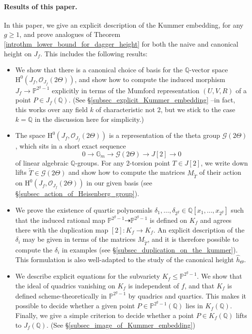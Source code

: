 \documentclass{article} %
\numberwithin{equation}{section}
\newcommand{\G}{\mathbb{G}}
\renewcommand{\P}{\mathbb{P}}
\newcommand{\HH}{\mathrm{H}}
\newcommand{\cO}{\mathcal{O}}
\newcommand{\Q}{\mathbb{Q}}
\begin{document}
\paragraph{Results of this paper.} In this paper, we give an explicit description of the Kummer embedding, for any $g \geq 1$, and prove analogues of Theorem \ref{introthm_lower_bound_for_dagger_height} for both the naive and canonical height on $J_f$. This includes the following results:
\begin{itemize}
    \item We  show that there is a canonical choice of basis for the $\Q$-vector space $\HH^0(J_f, \cO_{J_f}(2 \Theta))$, and show how to compute the induced morphism $J_f \to \P^{2^g-1}$ explicitly in terms of the Mumford representation $(U, V, R)$ of a point $P \in J_f(\Q)$. (See \S \ref{subsec_explicit_Kummer_embedding} --in fact, this works over any field $k$ of characteristic not 2, but we stick to the case $k = \Q$ in the discussion here for simplicity.) 
    \item The space $\HH^0(J_f, \cO_{J_f}(2 \Theta))$ is a representation of the theta group $\mathcal{G}(2 \Theta)$, which sits in a short exact sequence
    \[ 0 \to \G_m \to \mathcal{G}(2 \Theta) \to J[2] \to 0 \]
    of linear algebraic $\Q$-groups. For any 2-torsion point $T \in J[2]$, we write down lifts $\widetilde{T} \in \mathcal{G}(2 \Theta)$ and show how to compute the matrices $M_{\widetilde{T}}$ of their action on $\HH^0(J_f, \cO_{J_f}(2 \Theta))$ in our given basis (see \S \ref{subsec_action_of_Heisenberg_group}).
    \item We prove the existence of quartic polynomials $\delta_1, \dots, \delta_{2^g} \in \Q[x_1, \dots, x_{2^g}]$ such that the induced rational map $\P^{2^g-1} \dashrightarrow \P^{2^g-1}$ is defined on $K_f$ and agrees there with the duplication map $[2] : K_f \to K_f$. An explicit description of the $\delta_i$ may be given in terms of the matrices $M_{\widetilde{T}}$, and it is therefore possible to compute the $\delta_i$ in examples (see \S \ref{subsec_duplication_on_the_kummer}). This formulation is also well-adapted to the study of the canonical height $\widehat{h}_\Theta$.
    \item We describe explicit equations for the subvariety $K_f \leq \P^{2^g-1}$. We show that the ideal of quadrics vanishing on $K_f$ is independent of $f$, and that $K_f$ is defined scheme-theoretically in $\P^{2^g-1}$ by quadrics and quartics. This makes it possible to decide whether a given point $P \in \P^{2^g-1}(\Q)$ lies in $K_f(\Q)$. Finally, we give a simple criterion to decide whether a point $P \in K_f(\Q)$ lifts to $J_f(\Q)$. (See \S \ref{subsec_image_of_Kummer_embedding})  
\end{itemize}
\end{document}
